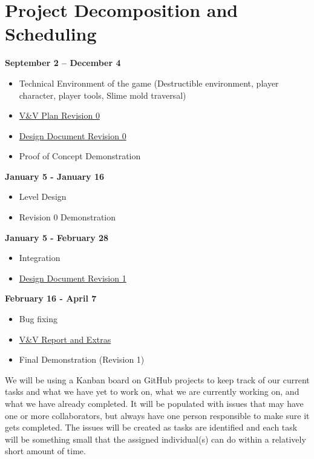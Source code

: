 \documentclass{article}
\begin{document}
\section{Project Decomposition and Scheduling}

\textbf{September 2 – December 4}
\begin{itemize}
\item{Technical Environment of the game (Destructible environment, player character, player tools, Slime mold traversal)}
\item{\href{https://github.com/felix-hurst/Ad-Natura/blob/main/docs/VnVPlan/VnVPlan.pdf}{V\&V Plan Revision 0}}
\item{\href{https://github.com/felix-hurst/Ad-Natura/tree/main/docs/Design}{Design Document Revision 0}}
\item{Proof of Concept Demonstration}
\end{itemize}

\textbf{January 5 - January 16}
\begin{itemize}
\item{Level Design}
\item{Revision 0 Demonstration}
\end{itemize}

\textbf{January 5 - February 28}
\begin{itemize}
\item{Integration}
\item{\href{https://github.com/felix-hurst/Ad-Natura/tree/main/docs/Design}{Design Document Revision 1}}
\end{itemize}

\textbf{February 16 - April 7}
\begin{itemize}
\item{Bug fixing}
\item{\href{https://github.com/felix-hurst/Ad-Natura/blob/main/docs/VnVReport/VnVReport.pdf}{V\&V Report and Extras}}
\item{Final Demonstration (Revision 1)}
\end{itemize}

We will be using a Kanban board on GitHub projects to keep track of our current tasks and what we have yet to work on, what we are currently working on, and what we have already completed. It will be populated with issues that may have one or more collaborators, but always have one person responsible to make sure it gets completed. The issues will be created as tasks are identified and each task will be something small that the assigned individual(s) can do within a relatively short amount of time.\\
\end{document}
